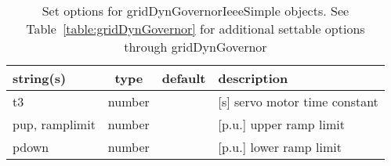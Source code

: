\begin{table}[ht]
\centering
\begin{tabular}{p{5cm} c c p{7cm}}
\hline
string(s) & type & default & description \\
\hline
t3 & number &  & [s]    servo motor time constant\\
pup, ramplimit & number &  & [p.u.] upper ramp limit\\
pdown & number &  & [p.u.] lower ramp limit\\
\hline
\end{tabular}
\caption{Set options for gridDynGovernorIeeeSimple objects. See Table~\ref{table:gridDynGovernor} for additional settable options through gridDynGovernor}
\label{table:gridDynGovernorIeeeSimple}
\end{table}

